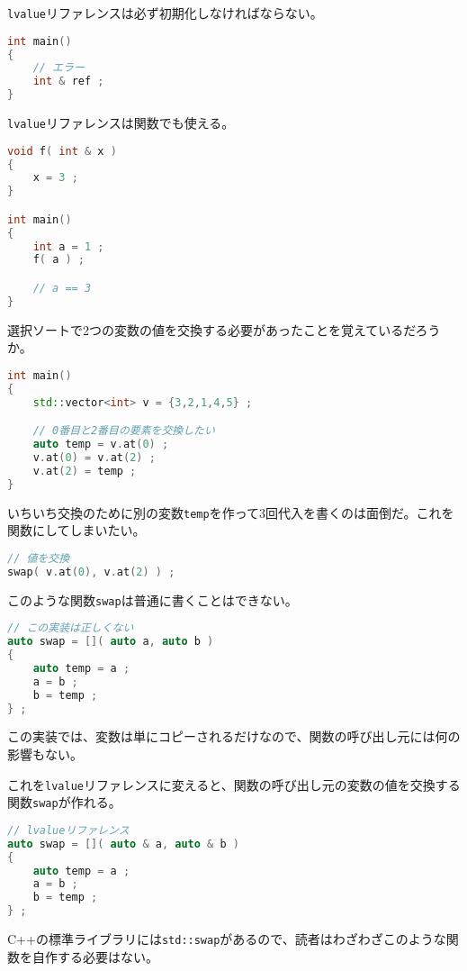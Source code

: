 \texttt{lvalue}リファレンスは必ず初期化しなければならない。

\begin{lstlisting}[language={C++}]
int main()
{
    // エラー
    int & ref ;
}
\end{lstlisting}

\texttt{lvalue}リファレンスは関数でも使える。

\begin{lstlisting}[language={C++}]
void f( int & x )
{
    x = 3 ;
}

int main()
{
    int a = 1 ;
    f( a ) ;

    // a == 3
}
\end{lstlisting}

選択ソートで2つの変数の値を交換する必要があったことを覚えているだろうか。

\begin{lstlisting}[language={C++}]
int main()
{
    std::vector<int> v = {3,2,1,4,5} ;

    // 0番目と2番目の要素を交換したい
    auto temp = v.at(0) ;
    v.at(0) = v.at(2) ;
    v.at(2) = temp ;
}
\end{lstlisting}

いちいち交換のために別の変数\texttt{temp}を作って3回代入を書くのは面倒だ。これを関数にしてしまいたい。

\begin{lstlisting}[language={C++}]
// 値を交換
swap( v.at(0), v.at(2) ) ;
\end{lstlisting}

このような関数\texttt{swap}は普通に書くことはできない。

\begin{lstlisting}[language={C++}]
// この実装は正しくない
auto swap = []( auto a, auto b )
{
    auto temp = a ;
    a = b ;
    b = temp ;
} ;
\end{lstlisting}

この実装では、変数は単にコピーされるだけなので、関数の呼び出し元には何の影響もない。

これを\texttt{lvalue}リファレンスに変えると、関数の呼び出し元の変数の値を交換する関数\texttt{swap}が作れる。

\ifTombow\pagebreak\fi
\begin{lstlisting}[language={C++}]
// lvalueリファレンス
auto swap = []( auto & a, auto & b )
{
    auto temp = a ;
    a = b ;
    b = temp ;
} ;
\end{lstlisting}

C++の標準ライブラリには\texttt{std::swap}があるので、読者はわざわざこのような関数を自作する必要はない。

